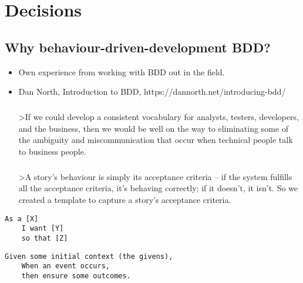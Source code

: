 \chapter{Decisions}


\section{Why behaviour-driven-development BDD?}

\begin{itemize}
\item Own experience from working with BDD out in the field.

\item Dan North, Introduction to BDD, https://dannorth.net/introducing-bdd/

\paragraph{}
    >If we could develop a consistent vocabulary for analysts, testers, developers, and the business, then we would be well on the way to eliminating some of the ambiguity and miscommunication that occur when technical people talk to business people.
    
\paragraph{}
    >A story’s behaviour is simply its acceptance criteria – if the system fulfills all the acceptance criteria, it’s behaving correctly; if it doesn’t, it isn’t. So we created a template to capture a story’s acceptance criteria.
\end{itemize}

\begin{lstlisting}[language=text,caption={As a, I want, so what}]
    As a [X]
    I want [Y]
    so that [Z]
\end{lstlisting}

\begin{lstlisting}[language=text,caption={given, when, then}]
    Given some initial context (the givens),
    When an event occurs,
    then ensure some outcomes.
\end{lstlisting}



